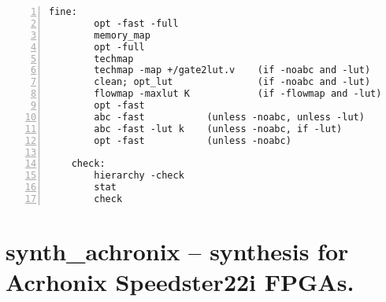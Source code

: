 \begin{lstlisting}[numbers=left,frame=single]
    fine:
        opt -fast -full
        memory_map
        opt -full
        techmap
        techmap -map +/gate2lut.v    (if -noabc and -lut)
        clean; opt_lut               (if -noabc and -lut)
        flowmap -maxlut K            (if -flowmap and -lut)
        opt -fast
        abc -fast           (unless -noabc, unless -lut)
        abc -fast -lut k    (unless -noabc, if -lut)
        opt -fast           (unless -noabc)

    check:
        hierarchy -check
        stat
        check
\end{lstlisting}

\section{synth\_achronix -- synthesis for Acrhonix Speedster22i FPGAs.}
\label{cmd:synth_achronix}
